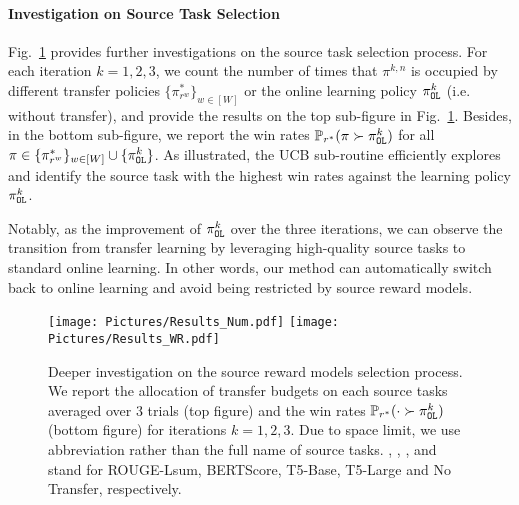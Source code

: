\paragraph{Investigation on Source Task Selection}
Fig.~\ref{fig:selection_details} provides further investigations on the source task selection process.
For each iteration $k=1,2,3$, we count the number of times that $\pi^{k,n}$ is occupied by different transfer policies $\{\pi^*_{r^w}\}_{w\in[W]}$ or the online learning policy $\pi^k_{\texttt{OL}}$ (i.e. without transfer), and provide the results on the top sub-figure in Fig.~\ref{fig:selection_details}.
Besides, in the bottom sub-figure, we report the win rates ${\mathbb{P}}_{r^*}(\pi \succ \pi^k_{\texttt{OL}})$ for all $\pi \in \{\pi^*_{r^w}\}_{w\in[W]} \cup \{\pi^k_{\texttt{OL}}\}$.
As illustrated, the UCB sub-routine efficiently explores and identify the source task with the highest win rates against the learning policy $\pi^k_{\texttt{OL}}$.

Notably, as the improvement of $\pi^k_{\texttt{OL}}$ over the three iterations, we can observe the transition from transfer learning by leveraging high-quality source tasks to standard online learning.
In other words, our method can automatically switch back to online learning and avoid being restricted by source reward models.


\begin{figure}[t]
    \centering
    \texttt{[image: Pictures/Results\_Num.pdf]}
    \texttt{[image: Pictures/Results\_WR.pdf]}
    \caption{Deeper investigation on the source reward models selection process. We report the allocation of transfer budgets on each source tasks averaged over 3 trials (top figure) and the win rates ${\mathbb{P}}_{r^*}(\cdot\succ\pi^k_{\texttt{OL}})$ (bottom figure) for iterations $k=1,2,3$.
    Due to space limit, we use abbreviation rather than the full name of source tasks.
    , , ,  and  stand for ROUGE-Lsum, BERTScore, T5-Base, T5-Large and No Transfer, respectively.
    }\label{fig:selection_details}
\end{figure}